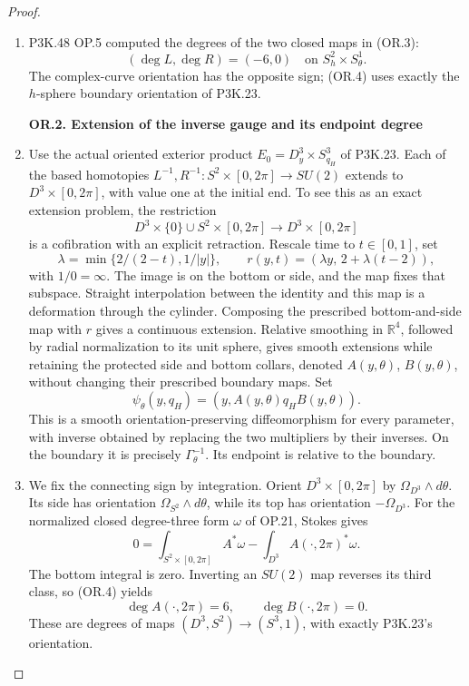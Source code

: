 \begin{proof}
\begin{enumerate}[label=\arabic*.]
\item P3K.48 OP.5 computed the degrees of the two closed maps in (OR.3):
\[
 (\deg L,\deg R)=(-6,0)
 \quad\text{on }S^2_h\times S^1_\theta.                \tag{OR.4}
\]
The complex-curve orientation has the opposite sign; (OR.4) uses
exactly the \(h\)-sphere boundary orientation of P3K.23.

\par

\medskip\noindent\textbf{OR.2. Extension of the inverse gauge and its endpoint degree}

\par\nobreak

\item Use the actual oriented exterior product
\(E_0=D^3_y\times S^3_{q_H}\) of P3K.23. Each of the based
homotopies \(L^{-1},R^{-1}:S^2\times[0,2\pi]\to SU(2)\)
extends to \(D^3\times[0,2\pi]\), with value one at the initial
end. To see this as an exact extension problem, the restriction
\[
 D^3\times\{0\}\cup S^2\times[0,2\pi]
                    \longrightarrow D^3\times[0,2\pi]
\]
is a cofibration with an explicit retraction. Rescale time to
\(t\in[0,1]\), set
\[
 \lambda=\min\{2/(2-t),1/|y|\},\qquad
 r(y,t)=(\lambda y,\,2+\lambda(t-2)),
\]
with \(1/0=\infty\). The image is on the bottom or side, and the
map fixes that subspace. Straight interpolation between the identity
and this map is a deformation through the cylinder. Composing the
prescribed bottom-and-side map with \(r\) gives a continuous
extension. Relative smoothing in \(\mathbb R^4\), followed by
radial normalization to its unit sphere, gives smooth extensions
while retaining the protected side and bottom collars, denoted
\(A(y,\theta)\), \(B(y,\theta)\), without changing their prescribed
boundary maps. Set
\[
 \psi_\theta(y,q_H)=
       (y,A(y,\theta)q_HB(y,\theta)).                \tag{OR.5}
\]
This is a smooth orientation-preserving diffeomorphism for every
parameter, with inverse obtained by replacing the two multipliers
by their inverses. On the boundary it is precisely
\(\Gamma_\theta^{-1}\). Its endpoint is relative to the boundary.

\item We fix the connecting sign by integration. Orient
\(D^3\times[0,2\pi]\) by \(\Omega_{D^3}\wedge d\theta\).
Its side has orientation \(\Omega_{S^2}\wedge d\theta\), while
its top has orientation \(-\Omega_{D^3}\). For the normalized
closed degree-three form \(\omega\) of OP.21, Stokes gives
\[
 0=\int_{S^2\times[0,2\pi]}A^*\omega
                    -\int_{D^3}A(\cdot,2\pi)^*\omega.
\]
The bottom integral is zero. Inverting an \(SU(2)\) map reverses
its third class, so (OR.4) yields
\[
 \deg A(\cdot,2\pi)=6,\qquad
 \deg B(\cdot,2\pi)=0.                               \tag{OR.6}
\]
These are degrees of maps \((D^3,S^2)\to(S^3,1)\), with exactly
P3K.23's orientation.


\end{enumerate}
\end{proof}
